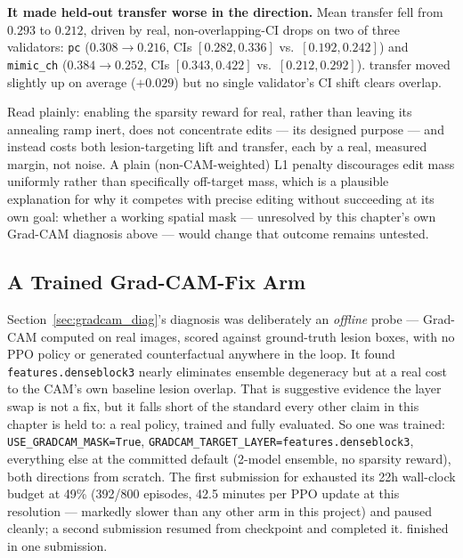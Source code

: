 \textbf{It made held-out transfer worse in the \pton{} direction.} Mean
\pton{} transfer fell from $0.293$ to $0.212$, driven by real,
non-overlapping-CI drops on two of three validators: \texttt{pc}
($0.308\to0.216$, CIs $[0.282,0.336]$ vs.\ $[0.192,0.242]$) and
\texttt{mimic\_ch} ($0.384\to0.252$, CIs $[0.343,0.422]$ vs.\
$[0.212,0.292]$). \ntop{} transfer moved slightly up on average
($+0.029$) but no single validator's CI shift clears overlap.

Read plainly: enabling the sparsity reward for real, rather than leaving
its annealing ramp inert, does not concentrate edits --- its designed
purpose --- and instead costs both lesion-targeting lift and \pton{}
transfer, each by a real, measured margin, not noise. A plain
(non-CAM-weighted) L1 penalty discourages edit mass uniformly rather than
specifically off-target mass, which is a plausible explanation for why it
competes with precise editing without succeeding at its own goal: whether
a working spatial mask --- unresolved by this chapter's own Grad-CAM
diagnosis above --- would change that outcome remains untested.

\subsection{A Trained Grad-CAM-Fix Arm}
\label{sec:gradcam_fix_arm}

Section~\ref{sec:gradcam_diag}'s diagnosis was deliberately an
\emph{offline} probe --- Grad-CAM computed on real images, scored against
ground-truth lesion boxes, with no PPO policy or generated counterfactual
anywhere in the loop. It found \texttt{features.denseblock3} nearly
eliminates ensemble degeneracy but at a real cost to the CAM's own
baseline lesion overlap. That is suggestive evidence the layer swap is
not a fix, but it falls short of the standard every other claim in this
chapter is held to: a real policy, trained and fully evaluated. So one
was trained: \texttt{USE\_GRADCAM\_MASK=True},
\texttt{GRADCAM\_TARGET\_LAYER=features.denseblock3}, everything else at
the committed default (2-model ensemble, no sparsity reward), both
directions from scratch. The first submission for \ntop{} exhausted its
22h wall-clock budget at 49\% (392/800 episodes, 42.5 minutes per PPO
update at this resolution --- markedly slower than any other arm in this
project) and paused cleanly; a second submission resumed from checkpoint
and completed it. \pton{} finished in one submission.


